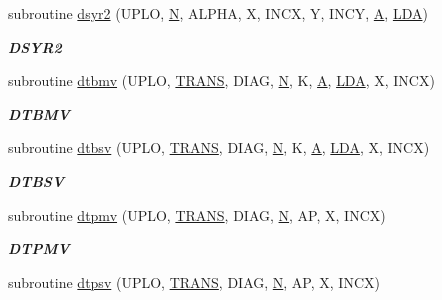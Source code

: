 \begin{DoxyCompactItemize}
subroutine \hyperlink{group__double__blas__level2_gae96880c53b8eaee70bbef273b905715f}{dsyr2} (U\+P\+L\+O, \hyperlink{polmisc_8c_a0240ac851181b84ac374872dc5434ee4}{N}, A\+L\+P\+H\+A, X, I\+N\+C\+X, Y, I\+N\+C\+Y, \hyperlink{classA}{A}, \hyperlink{example__user_8c_ae946da542ce0db94dced19b2ecefd1aa}{L\+D\+A})
\begin{DoxyCompactList}\small\item\em {\bfseries D\+S\+Y\+R2} \end{DoxyCompactList}\item 
subroutine \hyperlink{group__double__blas__level2_ga9f64da9e0125c712672fd89d166d3b9c}{dtbmv} (U\+P\+L\+O, \hyperlink{superlu__enum__consts_8h_a0c4e17b2d5cea33f9991ccc6a6678d62a1f61e3015bfe0f0c2c3fda4c5a0cdf58}{T\+R\+A\+N\+S}, D\+I\+A\+G, \hyperlink{polmisc_8c_a0240ac851181b84ac374872dc5434ee4}{N}, K, \hyperlink{classA}{A}, \hyperlink{example__user_8c_ae946da542ce0db94dced19b2ecefd1aa}{L\+D\+A}, X, I\+N\+C\+X)
\begin{DoxyCompactList}\small\item\em {\bfseries D\+T\+B\+M\+V} \end{DoxyCompactList}\item 
subroutine \hyperlink{group__double__blas__level2_ga7edc75158ea82b6d06c4b847de6996fa}{dtbsv} (U\+P\+L\+O, \hyperlink{superlu__enum__consts_8h_a0c4e17b2d5cea33f9991ccc6a6678d62a1f61e3015bfe0f0c2c3fda4c5a0cdf58}{T\+R\+A\+N\+S}, D\+I\+A\+G, \hyperlink{polmisc_8c_a0240ac851181b84ac374872dc5434ee4}{N}, K, \hyperlink{classA}{A}, \hyperlink{example__user_8c_ae946da542ce0db94dced19b2ecefd1aa}{L\+D\+A}, X, I\+N\+C\+X)
\begin{DoxyCompactList}\small\item\em {\bfseries D\+T\+B\+S\+V} \end{DoxyCompactList}\item 
subroutine \hyperlink{group__double__blas__level2_ga1d9a8ecfddfea2c84e73e28e1ebb74cf}{dtpmv} (U\+P\+L\+O, \hyperlink{superlu__enum__consts_8h_a0c4e17b2d5cea33f9991ccc6a6678d62a1f61e3015bfe0f0c2c3fda4c5a0cdf58}{T\+R\+A\+N\+S}, D\+I\+A\+G, \hyperlink{polmisc_8c_a0240ac851181b84ac374872dc5434ee4}{N}, A\+P, X, I\+N\+C\+X)
\begin{DoxyCompactList}\small\item\em {\bfseries D\+T\+P\+M\+V} \end{DoxyCompactList}\item 
subroutine \hyperlink{group__double__blas__level2_ga0fff73e765a7655a67da779c898863f1}{dtpsv} (U\+P\+L\+O, \hyperlink{superlu__enum__consts_8h_a0c4e17b2d5cea33f9991ccc6a6678d62a1f61e3015bfe0f0c2c3fda4c5a0cdf58}{T\+R\+A\+N\+S}, D\+I\+A\+G, \hyperlink{polmisc_8c_a0240ac851181b84ac374872dc5434ee4}{N}, A\+P, X, I\+N\+C\+X)

\end{DoxyCompactItemize}
